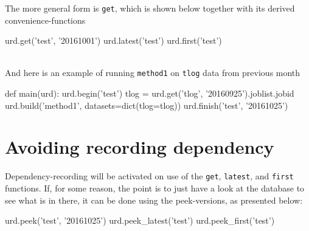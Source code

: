 The more general form is \texttt{get}, which is shown below together
with its derived convenience-functions
\\
\begin{python}
  urd.get('test', '20161001')
  urd.latest('test')
  urd.first('test')
\end{python}
\\
And here is an example of running \texttt{method1} on \texttt{tlog} data
from previous month
\\
\begin{python}
def main(urd):
  urd.begin('test')
  tlog = urd.get('tlog', '20160925').joblist.jobid
  urd.build('method1', datasets=dict(tlog=tlog))
  urd.finish('test', '20161025')
\end{python}



\section{Avoiding recording dependency}
Dependency-recording will be activated on use of the \texttt{get},
\texttt{latest}, and \texttt{first} functions.  If, for some reason,
the point is to just have a look at the database to see what is in
there, it can be done using the peek-versions, as presented below:
\\
\begin{python}
  urd.peek('test', '20161025')
  urd.peek_latest('test')
  urd.peek_first('test')
\end{python}



\newpage
